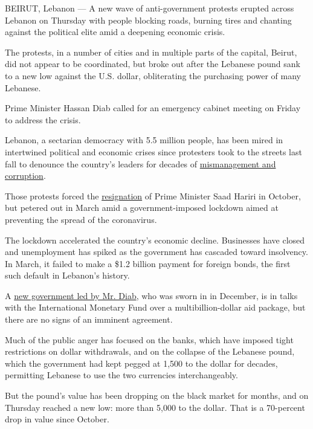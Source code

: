 BEIRUT, Lebanon --- A new wave of anti-government protests erupted
across Lebanon on Thursday with people blocking roads, burning tires and
chanting against the political elite amid a deepening economic crisis.

The protests, in a number of cities and in multiple parts of the
capital, Beirut, did not appear to be coordinated, but broke out after
the Lebanese pound sank to a new low against the U.S. dollar,
obliterating the purchasing power of many Lebanese.

Prime Minister Hassan Diab called for an emergency cabinet meeting on
Friday to address the crisis.

Lebanon, a sectarian democracy with 5.5 million people, has been mired
in intertwined political and economic crises since protesters took to
the streets last fall to denounce the country's leaders for decades of
\href{https://www.nytimes.com/2019/12/03/world/middleeast/lebanon-protests-corruption.html}{mismanagement
and corruption}.

Those protests forced the
\href{https://www.nytimes.com/2019/12/19/world/middleeast/lebanon-prime-minister-hassan-diab.html}{resignation}
of Prime Minister Saad Hariri in October, but petered out in March amid
a government-imposed lockdown aimed at preventing the spread of the
coronavirus.

The lockdown accelerated the country's economic decline. Businesses have
closed and unemployment has spiked as the government has cascaded toward
insolvency. In March, it failed to make a \$1.2 billion payment for
foreign bonds, the first such default in Lebanon's history.

A
\href{https://www.nytimes.com/2019/12/19/world/middleeast/lebanon-prime-minister-hassan-diab.html}{new
government led by Mr. Diab}, who was sworn in in December, is in talks
with the International Monetary Fund over a multibillion-dollar aid
package, but there are no signs of an imminent agreement.

Much of the public anger has focused on the banks, which have imposed
tight restrictions on dollar withdrawals, and on the collapse of the
Lebanese pound, which the government had kept pegged at 1,500 to the
dollar for decades, permitting Lebanese to use the two currencies
interchangeably.

But the pound's value has been dropping on the black market for months,
and on Thursday reached a new low: more than 5,000 to the dollar. That
is a 70-percent drop in value since October.

